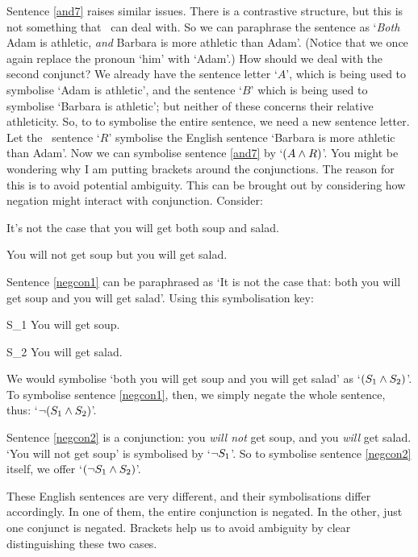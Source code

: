 Sentence \ref{and7} raises similar issues. There is a contrastive structure, but this is not something that \TFL\ can deal with. So we can paraphrase the sentence as `\emph{Both} Adam is athletic, \emph{and} Barbara is more athletic than Adam'. (Notice that we once again replace the pronoun `him' with `Adam'.) How should we deal with the second conjunct? We already have the sentence letter `$A$', which is being used to symbolise `Adam is athletic', and the sentence `$B$' which is being used to symbolise `Barbara is athletic'; but neither of these concerns their relative athleticity. So, to to symbolise the entire sentence, we need a new sentence letter. Let the \TFL\ sentence `$R$' symbolise the English sentence `Barbara is more athletic than Adam'. Now we can symbolise sentence \ref{and7} by `$(A \wedge R)$'.
You might be wondering why I am putting brackets around the conjunctions. The reason for this is to avoid potential ambiguity. This can be brought out by considering how negation might interact with conjunction. Consider:
	\begin{earg}
		\item[\ex{negcon1}] It's not the case that you will get both soup and salad.
		\item[\ex{negcon2}] You will not get soup but you will get salad.
	\end{earg}
Sentence \ref{negcon1} can be paraphrased as `It is not the case that: both you will get soup and you will get salad'. Using this symbolisation key:
	\begin{ekey}
		\item[S_1] You will get soup.
		\item[S_2] You will get salad.
	\end{ekey}
We would symbolise `both you will get soup and you will get salad' as `$(S_1 \wedge S_2)$'. To symbolise sentence \ref{negcon1}, then, we simply negate the whole sentence, thus: `$\neg (S_1 \wedge S_2)$'. 

Sentence \ref{negcon2} is a conjunction: you \emph{will not} get soup, and you \emph{will} get salad. `You will not get soup' is symbolised by `$\neg S_1$'. So to symbolise sentence \ref{negcon2} itself, we offer `$(\neg S_1 \wedge S_2)$'. 

These English sentences are very different, and their symbolisations differ accordingly. In one of them, the entire conjunction is negated. In the other, just one conjunct is negated. Brackets help us to avoid ambiguity by clear distinguishing these two cases.

